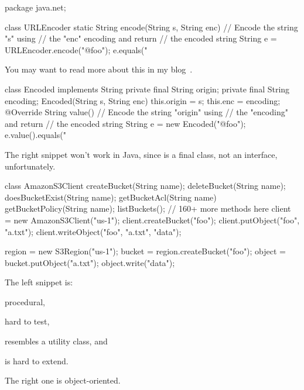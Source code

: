 \documentclass{article}
\begin{document}
\begin{pptWide}{2}
{\scriptsize\begin{ffcode}
package java.net;

class URLEncoder {
  static String encode(String s, String enc) {
    // Encode the string "s" using
    // the "enc" encoding and return
    // the encoded string
  }
}
String e = URLEncoder.encode("@foo");
e.equals("%
\end{ffcode}
}
You may want to read more about this in
my blog~\citep{bugayenko2015blog0309,bugayenko2017blog0912}.
\par\columnbreak\par
{\scriptsize\begin{ffcode}
class Encoded implements String {
  private final String origin;
  private final String encoding;
  Encoded(String s, String enc) {
    this.origin = s;
    this.enc = encoding;
  }
  @Override String value() {
    // Encode the string "origin" using
    // the "encoding" and return
    // the encoded string
  }
}
String e = new Encoded("@foo");
e.value().equals("%
\end{ffcode}
}
\end{pptWide}
\par
The right snippet won't work in Java, since  is a final class, not an interface, unfortunately.
\plush{}


\begin{pptWide}{2}
{\scriptsize\begin{ffcode}
class AmazonS3Client {
  createBucket(String name);
  deleteBucket(String name);
  doesBucketExist(String name);
  getBucketAcl(String name)
  getBucketPolicy(String name);
  listBuckets();
  // 160+ more methods here
}
client = new AmazonS3Client("us-1");
client.createBucket("foo");
client.putObject("foo", "a.txt");
client.writeObject("foo", "a.txt", "data");
\end{ffcode}
}
\par\columnbreak\par
{\scriptsize\begin{ffcode}
region = new S3Region("us-1");
bucket = region.createBucket("foo");
object = bucket.putObject("a.txt");
object.write("data");
\end{ffcode}
}
\end{pptWide}
\par
The left snippet is:
\begin{inparaenum}[1)]
\item procedural,
\item hard to test,
\item resembles a utility class,
and
\item is hard to extend.
\end{inparaenum}
The right one is object-oriented.
\plush{}
\end{document}
